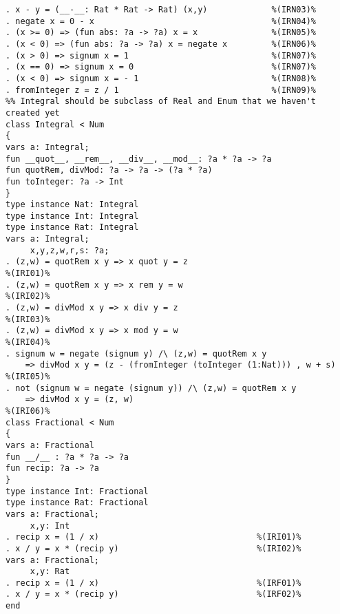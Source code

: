 \begin{Verbatim}
. x - y = (__-__: Rat * Rat -> Rat) (x,y)             %(IRN03)%
. negate x = 0 - x                                    %(IRN04)%
. (x >= 0) => (fun abs: ?a -> ?a) x = x               %(IRN05)%
. (x < 0) => (fun abs: ?a -> ?a) x = negate x         %(IRN06)%
. (x > 0) => signum x = 1                             %(IRN07)%
. (x == 0) => signum x = 0                            %(IRN07)%
. (x < 0) => signum x = - 1                           %(IRN08)%
. fromInteger z = z / 1                               %(IRN09)%
%% Integral should be subclass of Real and Enum that we haven't created yet
class Integral < Num
{
vars a: Integral;
fun __quot__, __rem__, __div__, __mod__: ?a * ?a -> ?a
fun quotRem, divMod: ?a -> ?a -> (?a * ?a)
fun toInteger: ?a -> Int
}
type instance Nat: Integral
type instance Int: Integral
type instance Rat: Integral
vars a: Integral;
     x,y,z,w,r,s: ?a;
. (z,w) = quotRem x y => x quot y = z                                    %(IRI01)%
. (z,w) = quotRem x y => x rem y = w                                     %(IRI02)%
. (z,w) = divMod x y => x div y = z                                      %(IRI03)%
. (z,w) = divMod x y => x mod y = w                                      %(IRI04)%
. signum w = negate (signum y) /\ (z,w) = quotRem x y                    
	=> divMod x y = (z - (fromInteger (toInteger (1:Nat))) , w + s)      %(IRI05)%
. not (signum w = negate (signum y)) /\ (z,w) = quotRem x y              
	=> divMod x y = (z, w)                                               %(IRI06)%
class Fractional < Num
{
vars a: Fractional
fun __/__ : ?a * ?a -> ?a
fun recip: ?a -> ?a
}
type instance Int: Fractional
type instance Rat: Fractional
vars a: Fractional;
     x,y: Int
. recip x = (1 / x)                                %(IRI01)%
. x / y = x * (recip y)                            %(IRI02)%
vars a: Fractional;
     x,y: Rat
. recip x = (1 / x)                                %(IRF01)%
. x / y = x * (recip y)                            %(IRF02)%
end
\end{Verbatim}

